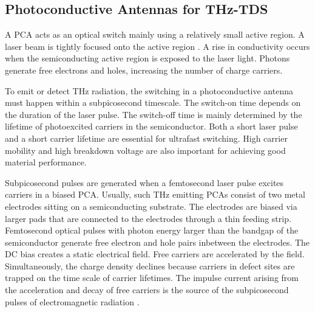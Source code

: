 






\subsection{Photoconductive Antennas for THz-TDS}
A PCA acts as an optical switch mainly using a relatively small active region. A laser beam is tightly focused onto the active region \cite{nandiErAsInAlGaAsPhotoconductors2021}. A rise in conductivity occurs when the semiconducting active region is exposed to the laser light. Photons generate free electrons and holes, increasing the number of charge carriers.

To emit or detect THz radiation, the switching in a photoconductive antenna must happen within a subpicosecond timescale. The switch-on time depends on the duration of the laser pulse. The switch-off time is mainly determined by the lifetime of photoexcited carriers in the semiconductor. Both a short laser pulse and a short carrier lifetime are essential for ultrafast switching. High carrier mobility and high breakdown voltage are also important for achieving good material performance.

Subpicosecond pulses are generated when a femtosecond laser pulse excites carriers in a biased PCA. Usually, such THz emitting PCAs consist of two metal electrodes sitting on a semiconducting substrate. The electrodes are biased via larger pads that are connected to the electrodes through a thin feeding strip. Femtosecond optical pulses with photon energy larger than the bandgap of the semiconductor generate free electron and hole pairs inbetween the electrodes. The DC bias creates a static electrical field. Free carriers are accelerated by the field. Simultaneously, the charge density declines because carriers in defect sites are trapped on the time scale of carrier lifetimes. The impulse current arising from the acceleration and decay of free carriers is the source of the subpicosecond pulses of electromagnetic radiation \cite{PrinciplesTerahertzScience2009}. 

